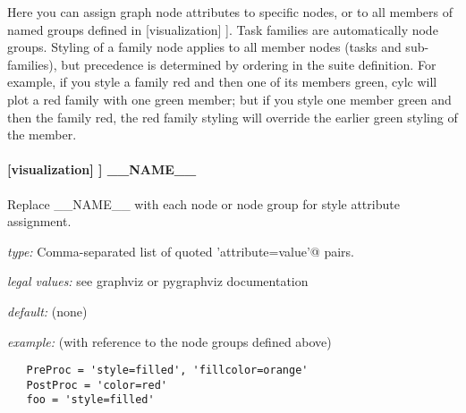Here you can assign graph node attributes to specific nodes, or to all
members of named groups defined in [visualization] \textrightarrow [[node
groups]]. Task families are automatically node groups. Styling of a
family node applies to all member nodes (tasks and sub-families), but
precedence is determined by ordering in the suite definition.  For
example, if you style a family red and then one of its members green,
cylc will plot a red family with one green member; but if you style one
member green and then the family red, the red family styling will
override the earlier green styling of the member.

\paragraph[\_\_NAME\_\_]{[visualization] \textrightarrow [[node attributes]] \textrightarrow \_\_NAME\_\_}

Replace \_\_NAME\_\_ with each node or node group for style attribute
assignment.

\begin{myitemize}
    \item {\em type:} Comma-separated list of quoted \lstinline@'attribute=value'@ pairs.
    \item {\em legal values:} see graphviz or pygraphviz documentation
    \item {\em default:} (none)
    \item {\em example:} (with reference to the node groups defined above)
\begin{lstlisting}
   PreProc = 'style=filled', 'fillcolor=orange'
   PostProc = 'color=red'
   foo = 'style=filled'
\end{lstlisting}
\end{myitemize}
